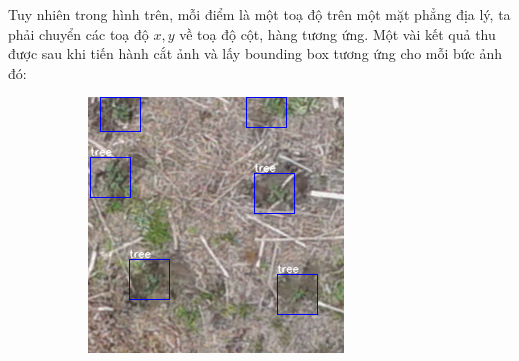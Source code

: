 \documentclass[a4paper, 12pt]{report}
\begin{document}
\begin{enumerate}[label= \textit{\alph*)}]
%
\newpage
Tuy nhiên trong hình trên, mỗi điểm là một toạ độ trên một mặt phẳng địa lý,  ta phải chuyển các toạ độ $x,y$ về toạ độ cột,  hàng tương ứng.  Một vài kết quả thu được sau khi tiến hành cắt ảnh và lấy bounding box tương ứng cho mỗi bức ảnh đó: 
\newpage
\begin{figure}[!h]
    \centering
    \begin{subfigure}[!h]{0.45\textwidth}
    \includegraphics[width=\linewidth]{Images/split1}
        \label{fig:subfig1}
    \end{subfigure}%
    \quad
    \begin{subfigure}[!h]{0.45\textwidth}

\end{subfigure}
\end{figure}
\end{enumerate}
\end{document}
